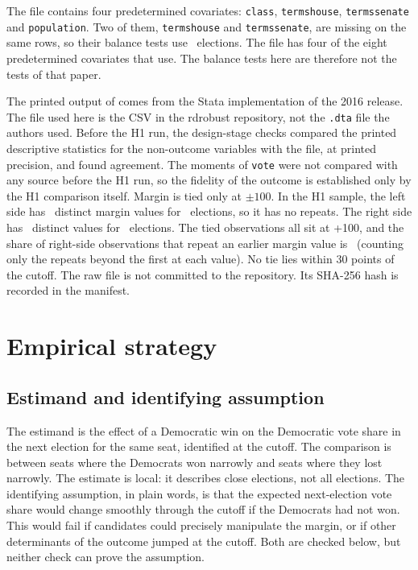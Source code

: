\documentclass[11pt]{article}
\begin{document}
The file contains four predetermined covariates: \texttt{class}, \texttt{termshouse}, \texttt{termssenate} and \texttt{population}. Two of them, \texttt{termshouse} and \texttt{termssenate}, are missing on the same rows, so their balance tests use \RdCovTermshouseN\ elections. The file has four of the eight predetermined covariates that \citet{cattaneo2015randomization} use. The balance tests here are therefore not the tests of that paper.

The printed output of \citet{calonico2017rdrobust} comes from the Stata implementation of the 2016 release. The file used here is the CSV in the rdrobust repository, not the \texttt{.dta} file the authors used. Before the H1 run, the design-stage checks compared the printed descriptive statistics for the non-outcome variables with the file, at printed precision, and found agreement. The moments of \texttt{vote} were not compared with any source before the H1 run, so the fidelity of the outcome is established only by the H1 comparison itself. Margin is tied only at $\pm 100$. In the H1 sample, the left side has \RdDistinctLeft\ distinct margin values for \RdNLeft\ elections, so it has no repeats. The right side has \RdDistinctRight\ distinct values for \RdNRight\ elections. The tied observations all sit at +100, and the share of right-side observations that repeat an earlier margin value is \RdMassRight\ (counting only the repeats beyond the first at each value). No tie lies within 30 points of the cutoff. The raw file is not committed to the repository. Its SHA-256 hash is recorded in the manifest.

\section{Empirical strategy}

\subsection{Estimand and identifying assumption}

The estimand is the effect of a Democratic win on the Democratic vote share in the next election for the same seat, identified at the cutoff. The comparison is between seats where the Democrats won narrowly and seats where they lost narrowly. The estimate is local: it describes close elections, not all elections. The identifying assumption, in plain words, is that the expected next-election vote share would change smoothly through the cutoff if the Democrats had not won. This would fail if candidates could precisely manipulate the margin, or if other determinants of the outcome jumped at the cutoff. Both are checked below, but neither check can prove the assumption.
\end{document}
